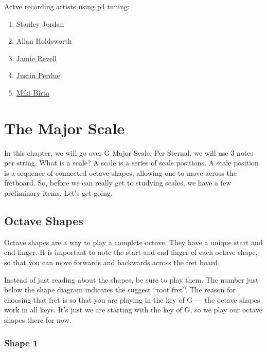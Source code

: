 \documentclass[12pt]{report}
\begin{document}
Actve recording artists using p4 tuning:

\begin{enumerate}
\item Stanley Jordan
\item Allan Holdsworth
\item \href{http://www.jamierevell.co.uk/}{Jamie Revell}
\item \href{http://www.reverbnation.com/justinperdue}{Justin Perdue}
\item \href{http://www.youtube.com/user/mikibirta}{Miki Birta}
\end{enumerate}


\chapter{The Major Scale}

In this chapter, we will go over G Major Scale. Per Sternal, we will use 3
notes per string. What is a scale? A scale is a series of scale
positions. A scale position is a sequence of connected octave
shapes, allowing one to move across the fretboard. So, before we can
really get to studying scales, we have a few preliminary items. Let's
get going.

\section{Octave Shapes}

Octave shapes are a way to play a complete octave. They have a unique
start and end finger. It is important to note the start and end finger
of each octave shape, so that you can move forwards and backwards
across the fret board.

Instead of just reading about the shapes, be sure to play them. The
number just below the shape diagram indicates the suggest ``root
fret''. The reason for choosing that fret is so that you are playing
in the key of G --- the octave shapes work in all keys. It's just we
are starting with the key of G, so we play our octave shapes there for
now. 

\subsection{Shape 1}
\begin{sideways}
  \def\numfrets{10}
\end{sideways}
\end{document}
